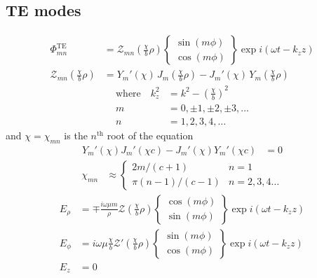 \documentclass[twoside, a4paper]{article}
\begin{document}
\subsection{TE modes}
\begin{align*}
\Phi_{mn}^{\text{TE}} & = 
	\mathcal{Z}_{mn} \left( \frac{\chi}{b} \rho \right)
	\left\{
	\begin{array}{c}
		\sin \left( m \phi \right) \\
		\cos \left( m \phi \right)
	\end{array}
	\right\}
	\exp i \left( \omega t - k_z z \right) \\
\mathcal{Z}_{mn} \left( \frac{\chi}{b} \rho \right) & =
	Y_m' \left( \chi \right) \, J_m \left( \frac{ \chi}{b} \rho \right) - 
	J_m' \left( \chi \right) \, Y_m \left( \frac{ \chi }{b} \rho \right)
\end{align*}
\begin{align*}
	\text{where} \quad
	k_z^2 & = k^2 - \left( \frac{\chi}{b} \right)^2 \\
	m & = 0, \pm1, \pm2, \pm3, \ldots \\
	n & = 1, 2, 3, 4, \ldots
\end{align*}
and $\chi = \chi_{mn}$ is the $n^{\text{th}}$ root of the equation
\begin{align*}
Y_m' \left( \chi \right) J_m' \left( \chi c \right) -
J_m' \left( \chi \right) Y_m' \left( \chi c \right) & = 0
\end{align*}
\begin{align*}
\chi_{mn} & \approx 
\left\{ 
	\begin{array}{cl}
		2m/(c+1)	&	n = 1 \\
		\pi (n-1)/(c-1)	&	n = 2,3,4 \ldots
	\end{array}
\right.
\end{align*}
\begin{align*}
E_{\rho} & =
	\mp \frac{i \omega \mu m}{\rho}
	\mathcal{Z} \left( \frac{\chi}{b} \rho \right)
	\left\{
	\begin{array}{c}
		\cos \left( m \phi \right) \\
		\sin \left( m \phi \right)
	\end{array}
	\right\}
	\exp i \left( \omega t - k_z z \right) \\
E_{\phi} & =
	i \omega \mu \frac{\chi}{b}
	\mathcal{Z}' \left( \frac{\chi}{b} \rho \right)
	\left\{
	\begin{array}{c}
		\sin \left( m \phi \right) \\
		\cos \left( m \phi \right)
	\end{array}
	\right\}
	\exp i \left( \omega t - k_z z \right) \\
E_z & = 0
\end{align*}
\end{document}
